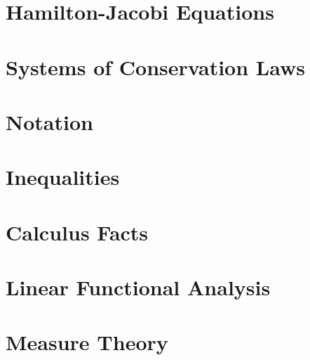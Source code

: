 \chapter{Hamilton-Jacobi Equations}
\label{chap:hamilton-jacobi-equations}


\chapter{Systems of Conservation Laws}
\label{chap:systems-of-conservation-laws}


\appendix

\chapter{Notation}
\label{chap:appendix-notation}


\chapter{Inequalities}
\label{chap:appendix-inequalities}


\chapter{Calculus Facts}
\label{chap:appendix-calculus-facts}


\chapter{Linear Functional Analysis}
\label{chap:appendix-linear-functional-analysis}


\chapter{Measure Theory}
\label{chap:appendix-measure-theory}

